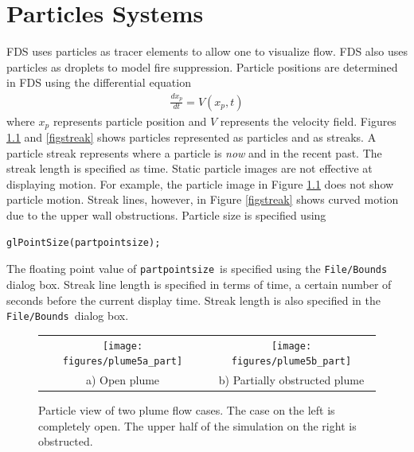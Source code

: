 \documentclass[11pt,twoside]{book}
\newcommand{\figoptions}{P}
\begin{document}
\chapter{Particles Systems}
FDS uses particles as tracer elements to allow one to visualize flow.  FDS
also uses particles as droplets to model fire suppression.  Particle positions are determined in FDS using the differential equation
\begin{eqnarray*}
\frac{dx_p}{dt}=V(x_p,t)
\end{eqnarray*}
where $x_p$ represents particle position and $V$ represents the velocity field.  Figures \ref{figpart} and \ref{figstreak}
shows particles represented as particles and
as streaks.
A particle streak represents where a particle is {\em now} and in the recent past.  The streak length is specified as time.
Static particle images are not effective at displaying motion.  For example, the particle image in Figure \ref{figpart} does not show particle motion.  Streak lines, however, in Figure \ref{figstreak} shows curved motion due to the upper wall obstructions.
Particle size is
specified using
\begin{verbatim}
glPointSize(partpointsize);
\end{verbatim}
The floating point value of {\tt partpointsize}\ is specified using the {\tt File/Bounds}
dialog box.  Streak line length is specified in terms of time, a certain number of seconds before the current display time.  Streak length is also specified in the {\tt File/Bounds}\ dialog box.

\begin{figure}[\figoptions]
\begin{center}
\begin{tabular}{cc}
\texttt{[image: figures/plume5a\_part]}&
\texttt{[image: figures/plume5b\_part]}\\
a) Open plume&b) Partially obstructed plume\\
\end{tabular}
\end{center}
\caption[Particle view of two plume flow cases.]
{Particle view of two plume flow cases.  The case on the left
is completely open.  The upper half of the simulation on the right is obstructed.
  }
\label{figpart}%
\end{figure}
\end{document}
